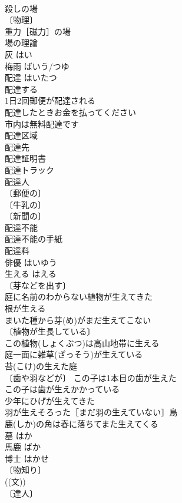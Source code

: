 \documentclass[8pt]{extreport}
\begin{document}
\begin{CJK}{UTF8}{min}
\\	殺しの場 
\\	〔物理〕
\\	重力［磁力］の場 
\\	場の理論 
\\	灰	はい	
\\	梅雨	ばいう/つゆ	
\\	配達	はいたつ	
\\	配達する 
\\	1日2回郵便が配達される 
\\	配達したときお金を払ってください 
\\	市内は無料配達です 
\\	配達区域 
\\	配達先 
\\	配達証明書 
\\	配達トラック 
\\	配達人 
\\	〔郵便の〕
\\	〔牛乳の〕
\\	〔新聞の〕
\\	配達不能 
\\	配達不能の手紙 
\\	配達料 
\\	俳優	はいゆう	
\\	生える	はえる	
\\	〔芽などを出す〕
\\	庭に名前のわからない植物が生えてきた 
\\	根が生える 
\\	まいた種から芽(め)がまだ生えてこない 
\\	〔植物が生長している〕
\\	この植物(しょくぶつ)は高山地帯に生える 
\\	庭一面に雑草(ざっそう)が生えている 
\\	苔(こけ)の生えた庭 
\\	〔歯や羽などが〕 この子は1本目の歯が生えた 
\\	この子は歯が生えかかっている 
\\	少年にひげが生えてきた 
\\	羽が生えそろった［まだ羽の生えていない］鳥 
\\	鹿(しか)の角は春に落ちてまた生えてくる 
\\	墓	はか	
\\	馬鹿	ばか	
\\	博士	はかせ	
\\	〔物知り〕
\\	((文)) 
\\	〔達人〕

\end{CJK}
\end{document}
